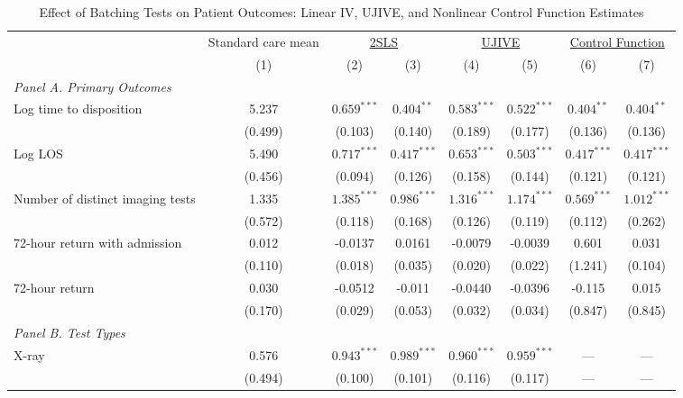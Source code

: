 \documentclass[11pt]{article}
\newcommand{\1}{\hbox{\rm 1\kern-.35em 1}}
\begin{document}
\begin{table}[t!]
\centering
\caption{Effect of Batching Tests on Patient Outcomes: Linear IV, UJIVE, and Nonlinear Control Function Estimates}
\label{tab:results_table}
\begin{threeparttable}
\begin{tabular}{lccccccc}
\toprule
& Standard care mean 
& \multicolumn{2}{c}{\underline{2SLS}} 
& \multicolumn{2}{c}{\underline{UJIVE}} 
& \multicolumn{2}{c}{\underline{Control Function}} \\
& (1) & (2) & (3) & (4) & (5) & (6) & (7) \\
\midrule

\multicolumn{8}{l}{\textit{Panel A. Primary Outcomes}} \\[0.5em]

Log time to disposition 
& 5.237 
& $0.659^{***}$ & $0.404^{**}$
& $0.583^{***}$ & $0.522^{***}$
& $0.404^{**}$ & $0.404^{**}$ \\
& (0.499)
& (0.103) & (0.140)
& (0.189) & (0.177)
& (0.136) & (0.136) \\[0.5em]

Log LOS
& 5.490
& $0.717^{***}$ & $0.417^{***}$
& $0.653^{***}$ & $0.503^{***}$
& $0.417^{***}$ & $0.417^{***}$ \\
& (0.456)
& (0.094) & (0.126)
& (0.158) & (0.144)
& (0.121) & (0.121) \\[0.5em]

Number of distinct imaging tests 
& 1.335
& $1.385^{***}$ & $0.986^{***}$
& $1.316^{***}$ & $1.174^{***}$
& $0.569^{***}$ & $1.012^{***}$ \\
& (0.572)
& (0.118) & (0.168)
& (0.126) & (0.119)
& (0.112) & (0.262) \\[0.5em]

72-hour return with admission 
& 0.012
& -0.0137 & 0.0161
& -0.0079 & -0.0039
& 0.601 & 0.031 \\
& (0.110)
& (0.018) & (0.035)
& (0.020) & (0.022)
& (1.241) & (0.104) \\[0.5em]

72-hour return 
& 0.030
& -0.0512 & -0.011
& -0.0440 & -0.0396
& -0.115 & 0.015 \\
& (0.170)
& (0.029) & (0.053)
& (0.032) & (0.034)
& (0.847) & (0.845) \\[0.5em]

\multicolumn{8}{l}{\textit{Panel B. Test Types}} \\[0.5em]

X-ray 
& 0.576
& $0.943^{***}$ & $0.989^{***}$
& $0.960^{***}$ & $0.959^{***}$
& --- & --- \\
& (0.494)
& (0.100) & (0.101)
& (0.116) & (0.117)
& --- & --- \\[0.5em]


\end{tabular}
\end{threeparttable}
\end{table}
\end{document}

